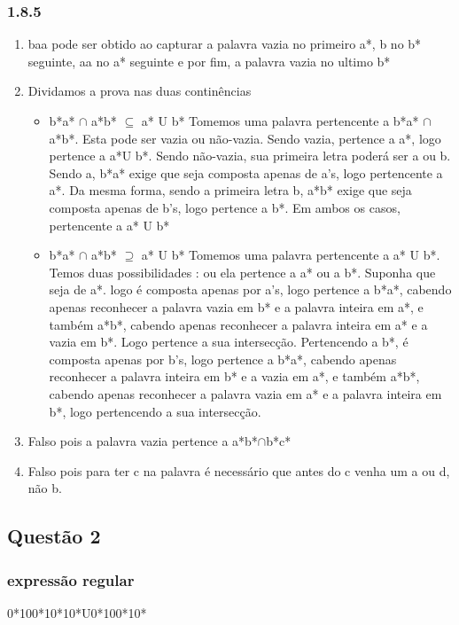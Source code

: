 \documentclass{article}
\begin{document}
	\subsubsection{1.8.5}
		\begin{enumerate}[label=(\alph*)]
		\item baa pode ser obtido ao capturar a palavra vazia no primeiro a*, b no b* seguinte, aa no a* seguinte e por fim, a palavra vazia no ultimo b*
		\item Dividamos a prova nas duas continências
			\begin{itemize}
				\item b*a* $\cap$ a*b* $\subseteq$ a* U b*
					Tomemos uma palavra pertencente a b*a* $\cap$ a*b*. Esta pode ser vazia ou não-vazia. Sendo vazia, pertence a a*, logo pertence a a*U b*. Sendo não-vazia, sua primeira letra poderá ser a ou b. Sendo a, b*a* exige que seja composta apenas de a's, logo pertencente a a*. Da mesma forma, sendo a primeira letra b, a*b* exige que seja composta apenas de b's, logo pertence a b*. Em ambos os casos, pertencente a a* U b*
				\item b*a* $\cap$ a*b* $\supseteq$ a* U b*
				Tomemos uma palavra pertencente a a* U b*. Temos duas possibilidades : ou ela pertence a a* ou a b*. Suponha que seja de a*. logo é composta apenas por a's, logo pertence a b*a*, cabendo apenas reconhecer a palavra vazia em b* e a palavra inteira em a*, e também a*b*, cabendo apenas reconhecer a palavra inteira em a* e a vazia em b*. Logo pertence a sua intersecção. Pertencendo a b*, é composta apenas por b's, logo pertence a b*a*, cabendo apenas reconhecer a palavra inteira em b* e a vazia em a*, e também a*b*, cabendo apenas reconhecer a palavra vazia em a* e a palavra inteira em b*, logo pertencendo a sua intersecção.
			\end{itemize}
		\item Falso pois a palavra vazia pertence a a*b*$\cap$b*c*
		\item Falso pois para ter c na palavra é necessário que antes do c venha um a ou d, não b.
	\end{enumerate}
	
	\subsection{Questão 2}
	\subsubsection{expressão regular}
	0*100*10*10*U0*100*10*
\end{document}
